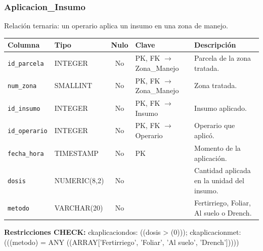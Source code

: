 \documentclass[11pt,letterpaper]{article}
\newcommand{\tbus}{\textunderscore\allowbreak}
\newcommand{\tb}[1]{{\ttfamily\let\_\tbus #1}}
\begin{document}
\subsubsection*{Aplicacion\_Insumo}
Relación ternaria: un operario aplica un insumo en una zona de manejo.
{\footnotesize
\begin{longtable}{>{\raggedright\arraybackslash}p{3.3cm}>{\raggedright\arraybackslash}p{2.5cm}c>{\raggedright\arraybackslash}p{2.2cm}>{\raggedright\arraybackslash}p{6.1cm}}
\toprule
\textbf{Columna} & \textbf{Tipo} & \textbf{Nulo} & \textbf{Clave} & \textbf{Descripción} \\
\midrule
\endhead
\texttt{id\_parcela} & INTEGER & No & PK, FK $\to$ Zona\_Manejo & Parcela de la zona tratada. \\
\texttt{num\_zona} & SMALLINT & No & PK, FK $\to$ Zona\_Manejo & Zona tratada. \\
\texttt{id\_insumo} & INTEGER & No & PK, FK $\to$ Insumo & Insumo aplicado. \\
\texttt{id\_operario} & INTEGER & No & PK, FK $\to$ Operario & Operario que aplicó. \\
\texttt{fecha\_hora} & TIMESTAMP & No & PK & Momento de la aplicación. \\
\texttt{dosis} & NUMERIC(8,2) & No &  & Cantidad aplicada en la unidad del insumo. \\
\texttt{metodo} & VARCHAR(20) & No &  & Fertirriego, Foliar, Al suelo o Drench. \\
\bottomrule
\end{longtable}}
{\footnotesize\raggedright\textbf{Restricciones CHECK:} \tb{ck\_aplicacion\_dos}: \tb{((dosis > (0)))}; \tb{ck\_aplicacion\_met}: \tb{(((metodo) = ANY ((ARRAY['Fertirriego', 'Foliar', 'Al suelo', 'Drench']))))}\par}
\medskip
\end{document}
